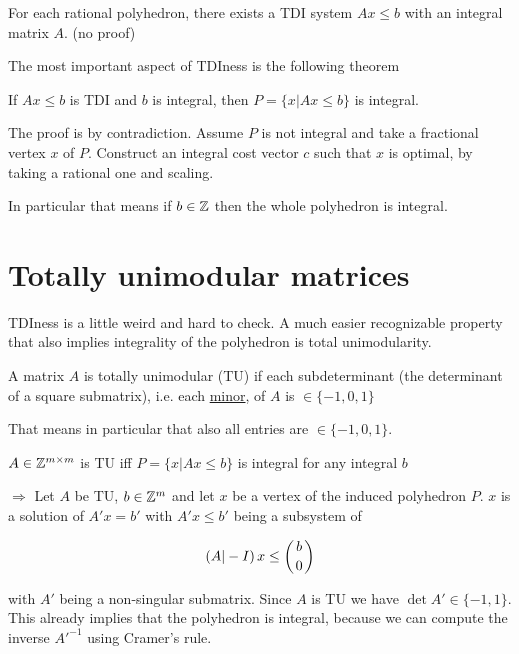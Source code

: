 \begin{thm} For each rational polyhedron, there exists a TDI system $Ax\leq b$ with an integral matrix $A$. {\small (no proof)}
\end{thm}

The most important aspect of TDIness is the following theorem

\begin{thm} If $Ax\leq b$ is TDI and $b$ is integral, then $P=\{x|Ax\leq b\}$ is integral.
\end{thm}

\begin{pr} The proof is by contradiction. Assume $P$ is not integral and take a fractional vertex $x$ of $P$. Construct an integral cost vector $c$ such that $x$ is optimal, by taking a rational one and scaling.

In particular that means if $b\in \mathbb{Z}$ then the whole polyhedron is integral. 

\section{Totally unimodular matrices}

TDIness is a little weird and hard to check. A much easier recognizable property that also implies integrality of the polyhedron is total unimodularity.

\begin{Def} A matrix $A$ is totally unimodular (TU) if each subdeterminant (the determinant of a square submatrix), i.e. each \href{http://en.wikipedia.org/wiki/Minor\_\%28linear\_algebra\%29}{minor}, of $A$ is $\in \{-1,0,1\}$
\end{Def}

That means in particular that also all entries are $\in \{-1,0,1\}$.

\begin{thm} $A\in \mathbb{Z}^{m\times m}$ is TU iff $P=\{x|Ax\leq b\}$ is integral for any integral $b$
\end{thm}

\begin{pr} $\Rightarrow$ Let $A$ be TU, $b\in \mathbb{Z}^m$ and let $x$ be a vertex of the induced polyhedron $P$. $x$ is a solution of $A'x=b'$ with $A'x\leq b'$ being a subsystem of 

\[\left(A|-I\right) x \leq \left(b\atop 0\right)\]

with $A'$ being a non-singular submatrix. Since $A$ is TU we have $\det A'\in \{-1,1\}$. This already implies that the polyhedron is integral, because we can compute the inverse $A'^{-1}$ using Cramer's rule. %



\end{pr}
\end{pr}
